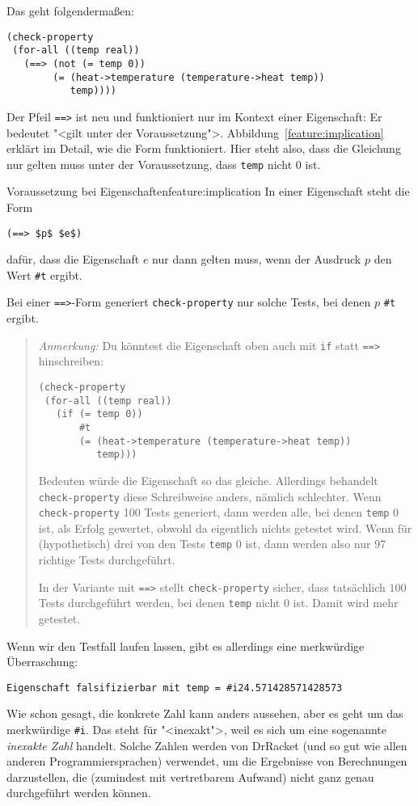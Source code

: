 Das geht folgendermaßen:
%
\begin{lstlisting}
(check-property
 (for-all ((temp real))
   (==> (not (= temp 0))
        (= (heat->temperature (temperature->heat temp))
           temp))))
\end{lstlisting}
%
Der Pfeil \lstinline{==>} ist neu und funktioniert nur im Kontext
einer Eigenschaft: Er bedeutet "<gilt unter der Voraussetzung">.
Abbildung~\ref{feature:implication} erklärt im Detail, wie die Form
funktioniert.  Hier steht also, dass die Gleichung nur gelten muss
unter der Voraussetzung, dass \lstinline{temp} nicht $0$ ist.

\begin{feature}{Voraussetzung bei Eigenschaften}{feature:implication}
  In einer Eigenschaft steht die Form
\begin{lstlisting}
(==> $p$ $e$)
\end{lstlisting}
  dafür, dass die Eigenschaft $e$ nur dann gelten muss, wenn der
  Ausdruck $p$ den Wert \lstinline{#t} ergibt.

  Bei einer \lstinline{==>}-Form generiert \lstinline{check-property}
  nur solche Tests, bei denen $p$ \lstinline{#t} ergibt.
\end{feature}
%
\begin{quote}
\noindent \emph{Anmerkung:} Du könntest die Eigenschaft oben
auch mit \lstinline{if} statt \lstinline{==>} hinschreiben:
%
\begin{lstlisting}
(check-property
 (for-all ((temp real))
   (if (= temp 0))
       #t
       (= (heat->temperature (temperature->heat temp))
          temp)))
\end{lstlisting}
%
Bedeuten würde die Eigenschaft so das gleiche.  Allerdings behandelt
\lstinline{check-property} diese Schreibweise anders, nämlich
schlechter.  Wenn \lstinline{check-property} 100 Tests generiert, dann
werden alle, bei denen \lstinline{temp} $0$ ist, als Erfolg gewertet,
obwohl da eigentlich nichts getestet wird.  Wenn für (hypothetisch)
drei von den Tests \lstinline{temp} $0$ ist, dann werden also nur 97
richtige Tests durchgeführt.

In der Variante mit \lstinline{==>} stellt
\lstinline{check-property} sicher, dass tatsächlich $100$ Tests
durchgeführt werden, bei denen \lstinline{temp} nicht $0$ ist.  Damit
wird mehr getestet.
\end{quote}
%
Wenn wir den Testfall laufen lassen, gibt es allerdings eine
merkwürdige Überraschung:
%
\begin{lstlisting}
Eigenschaft falsifizierbar mit temp = #i24.571428571428573
\end{lstlisting}
%
Wie schon gesagt, die konkrete Zahl kann anders aussehen, aber es geht
um das merkwürdige \mbox{\lstinline{#i}}.  Das steht für "<inexakt">, weil es
sich um eine sogenannte \textit{inexakte Zahl}
handelt.  Solche Zahlen werden von DrRacket (und so gut wie allen
anderen Programmiersprachen) verwendet, um die Ergebnisse von
Berechnungen darzustellen, die (zumindest mit vertretbarem Aufwand)
nicht ganz genau durchgeführt werden können.

